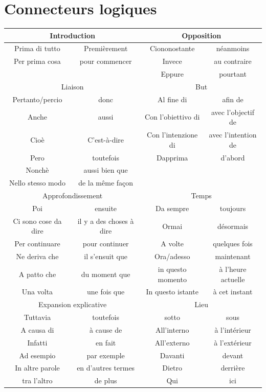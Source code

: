 \documentclass[12pt, openany]{report}
\begin{document}
\section{Connecteurs logiques}
\begin{center}
\begin{tabular}{|c|c|c|c|}
\hline
\multicolumn{2}{|c|}{Introduction} & \multicolumn{2}{c|}{Opposition} \\ \hline
Prima di tutto & Premièrement & Ciononostante & néanmoins \\ 
Per prima cosa & pour commencer & Invece & au contraire \\ 
 &  & Eppure & pourtant \\ \hline

\multicolumn{2}{|c|}{Liaison} & \multicolumn{2}{c|}{But} \\ \hline
Pertanto/percio & donc & Al fine di & afin de \\
Anche & aussi & Con l'obiettivo di & avec l'objectif de \\
Cioè & C'est-à-dire & Con l'intenzione di & avec l'intention de \\
Pero & toutefois & Dapprima & d'abord \\
Nonchè & aussi bien que &  &  \\
Nello stesso modo & de la même façon &  &  \\ \hline

\multicolumn{2}{|c|}{Approfondissement} & \multicolumn{2}{c|}{Temps} \\ \hline
Poi & ensuite & Da sempre & toujours \\
Ci sono cose da dire & il y a des choses à dire & Ormai & désormais \\
Per continuare & pour continuer & A volte & quelques fois \\
Ne deriva che & il s'ensuit que & Ora/adesso & maintenant \\
A patto che & du moment que & in questo momento & à l'heure actuelle \\
Una volta & une fois que & In questo istante & à cet instant \\ \hline

\multicolumn{2}{|c|}{Expansion explicative} & \multicolumn{2}{c|}{Lieu} \\ \hline
Tuttavia & toutefois & sotto & sous \\
A causa di & à cause de & All'interno & à l'intérieur \\
Infatti & en fait & All'externo & à l'extérieur \\
Ad esempio & par exemple & Davanti & devant \\
In altre parole & en d'autres termes & Dietro & derrière \\
tra l'altro & de plus & Qui & ici \\ \hline


\end{tabular}
\end{center}
\end{document}
